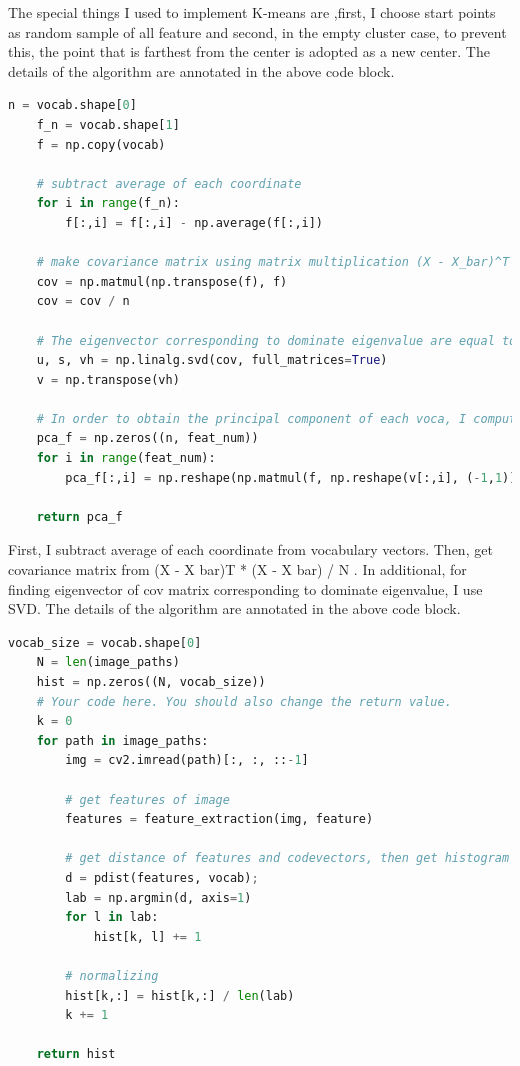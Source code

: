 The special things I used to implement K-means are ,first, I choose start points as random sample of all feature and second, in the empty cluster case, to prevent this, the point that is farthest from the center is adopted as a new center. The details of the algorithm are annotated in the above code block.


\lstset{numbers = left, numbersep=5pt, breaklines=true}
\begin{lstlisting}[language=python, caption = {PCA}]
    n = vocab.shape[0]
    f_n = vocab.shape[1]
    f = np.copy(vocab)

    # subtract average of each coordinate
    for i in range(f_n):
        f[:,i] = f[:,i] - np.average(f[:,i])

    # make covariance matrix using matrix multiplication (X - X_bar)^T * (X - X_bar) / N
    cov = np.matmul(np.transpose(f), f)
    cov = cov / n

    # The eigenvector corresponding to dominate eigenvalue are equal to the first,second,.. column vector of V when a singular value decomposition.
    u, s, vh = np.linalg.svd(cov, full_matrices=True)
    v = np.transpose(vh)

    # In order to obtain the principal component of each voca, I compute the inner product feature vector with eigenvector.
    pca_f = np.zeros((n, feat_num))
    for i in range(feat_num):
        pca_f[:,i] = np.reshape(np.matmul(f, np.reshape(v[:,i], (-1,1))), -1)

    return pca_f
\end{lstlisting}

First, I subtract average of each coordinate from vocabulary vectors. Then, get covariance matrix from (X - X bar)T * (X - X bar) / N . In additional, for finding eigenvector of cov matrix corresponding to dominate eigenvalue, I use SVD. The details of the algorithm are annotated in the above code block.

\lstset{numbers = left, numbersep=5pt, breaklines=true}
\begin{lstlisting}[language=python, caption = {Bag of words}]
    vocab_size = vocab.shape[0]
    N = len(image_paths)
    hist = np.zeros((N, vocab_size))
    # Your code here. You should also change the return value.
    k = 0
    for path in image_paths:
        img = cv2.imread(path)[:, :, ::-1]
        
        # get features of image
        features = feature_extraction(img, feature)

        # get distance of features and codevectors, then get histogram
        d = pdist(features, vocab);
        lab = np.argmin(d, axis=1)
        for l in lab:
            hist[k, l] += 1
		
        # normalizing
        hist[k,:] = hist[k,:] / len(lab)
        k += 1
        
    return hist
\end{lstlisting}

